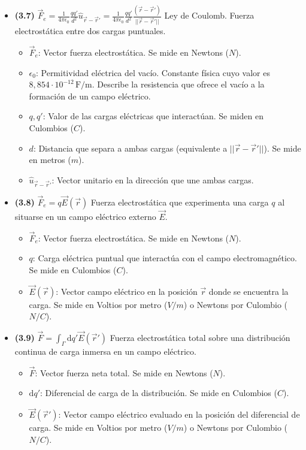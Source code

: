 \documentclass{article}
\begin{document}
\begin{itemize}
				\item \textbf{(3.7)} $\boxed{\vec{F}_e = \frac{1}{4\pi\epsilon_{0}} \frac{q q'}{d^2} \hat{u}_{\vec{r}-\vec{r}'} = \frac{1}{4\pi\epsilon_{0}} \frac{q q'}{d^2} \frac{(\vec{r} - \vec{r}')}{\vert{}\vert{}\vec{r} - \vec{r}'\vert{}\vert{}}}$ Ley de Coulomb. Fuerza electrostática entre dos cargas puntuales.
					\begin{itemize}
						\item $\vec{F}_e$: Vector fuerza electrostática. Se mide en Newtons ($N$).
						\item $\epsilon_{0}$: Permitividad eléctrica del vacío. Constante física cuyo valor es $8,854\cdot10^{-12}\,\text{F/m}$. Describe la resistencia que ofrece el vacío a la formación de un campo eléctrico.
						\item $q, q'$: Valor de las cargas eléctricas que interactúan. Se miden en Culombios ($C$).
						\item $d$: Distancia que separa a ambas cargas (equivalente a $\vert{}\vert{}\vec{r} - \vec{r}'\vert{}\vert{}$). Se mide en metros ($m$).
						\item $\hat{u}_{\vec{r}-\vec{r}'}$: Vector unitario en la dirección que une ambas cargas.
					\end{itemize}

				\item \textbf{(3.8)} $\boxed{\vec{F}_e = q \vec{E}(\vec{r})}$ Fuerza electrostática que experimenta una carga $q$ al situarse en un campo eléctrico externo $\vec{E}$.
					\begin{itemize}
						\item $\vec{F}_e$: Vector fuerza electrostática. Se mide en Newtons ($N$).
						\item $q$: Carga eléctrica puntual que interactúa con el campo electromagnético. Se mide en Culombios ($C$).
						\item $\vec{E}(\vec{r})$: Vector campo eléctrico en la posición $\vec{r}$ donde se encuentra la carga. Se mide en Voltios por metro ($V/m$) o Newtons por Culombio ($N/C$).
					\end{itemize}

				\item \textbf{(3.9)} $\boxed{\vec{F} = \int_\Gamma \mathrm{d}q' \vec{E}(\vec{r}')}$ Fuerza electrostática total sobre una distribución continua de carga inmersa en un campo eléctrico.
					\begin{itemize}
						\item $\vec{F}$: Vector fuerza neta total. Se mide en Newtons ($N$).
						\item $\mathrm{d}q'$: Diferencial de carga de la distribución. Se mide en Culombios ($C$).
						\item $\vec{E}(\vec{r}')$: Vector campo eléctrico evaluado en la posición del diferencial de carga. Se mide en Voltios por metro ($V/m$) o Newtons por Culombio ($N/C$).
					\end{itemize}


\end{itemize}
\end{document}
